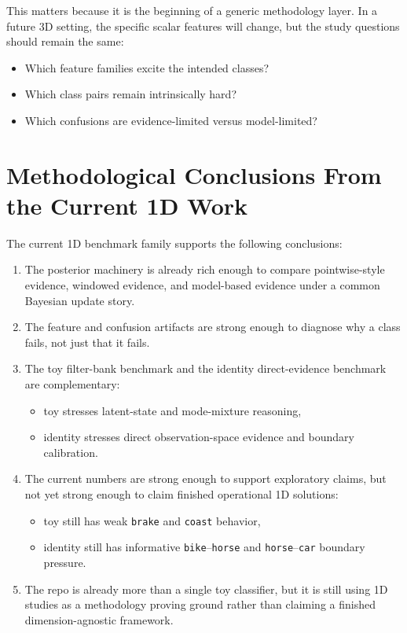 \documentclass[11pt]{article}
\begin{document}
This matters because it is the beginning of a generic methodology layer. In a
future 3D setting, the specific scalar features will change, but the study
questions should remain the same:
\begin{itemize}[leftmargin=1.5em]
    \item Which feature families excite the intended classes?
    \item Which class pairs remain intrinsically hard?
    \item Which confusions are evidence-limited versus model-limited?
\end{itemize}

\section{Methodological Conclusions From the Current 1D Work}

The current 1D benchmark family supports the following conclusions:
\begin{enumerate}[leftmargin=1.8em]
    \item The posterior machinery is already rich enough to compare
    pointwise-style evidence, windowed evidence, and model-based evidence under
    a common Bayesian update story.
    \item The feature and confusion artifacts are strong enough to diagnose why
    a class fails, not just that it fails.
    \item The toy filter-bank benchmark and the identity direct-evidence
    benchmark are complementary:
    \begin{itemize}[leftmargin=1.5em]
        \item toy stresses latent-state and mode-mixture reasoning,
        \item identity stresses direct observation-space evidence and boundary
        calibration.
    \end{itemize}
    \item The current numbers are strong enough to support exploratory claims,
    but not yet strong enough to claim finished operational 1D solutions:
    \begin{itemize}[leftmargin=1.5em]
        \item toy still has weak \texttt{brake} and \texttt{coast} behavior,
        \item identity still has informative \texttt{bike}--\texttt{horse}
        and \texttt{horse}--\texttt{car} boundary pressure.
    \end{itemize}
    \item The repo is already more than a single toy classifier, but it is
    still using 1D studies as a methodology proving ground rather than claiming
    a finished dimension-agnostic framework.
\end{enumerate}
\end{document}
